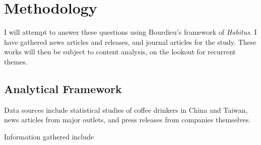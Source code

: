 \section{Methodology}\label{sec:methodology}

I will attempt to answer these questions using Bourdieu's framework of
\emph{Habitus}. I have gathered news articles and releases, and journal articles
for the study. These works will then be subject to content analysis, on the
lookout for recurrent themes.

\subsection{Analytical Framework}\label{subs:analyticf}

Data sources include statistical studies of coffee drinkers in China
and Taiwan, news articles from major outlets, and press releases from companies
themselves.

Information gathered include 

